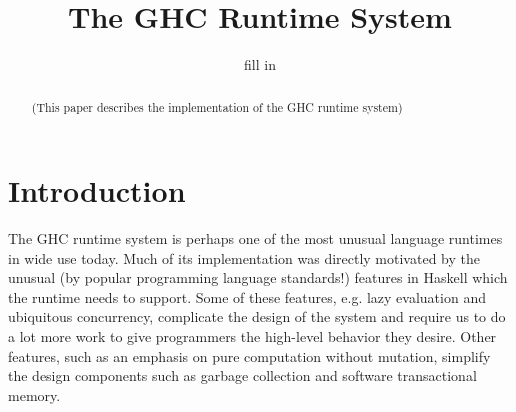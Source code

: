 \documentclass{jfp1}
\title{The GHC Runtime System}
\author{fill in}
\begin{document}
\maketitle

\begin{abstract}
(This paper describes the implementation of the GHC runtime system)
\end{abstract}

\tableofcontents

\section{Introduction}

The GHC runtime system is perhaps one of the most unusual language
runtimes in wide use today.  Much of its implementation was directly
motivated by the unusual (by popular programming language standards!)
features in Haskell which the runtime needs to support.  Some of these
features, e.g. lazy evaluation and ubiquitous concurrency, complicate
the design of the system and require us to do a lot more work to give
programmers the high-level behavior they desire.  Other features, such
as an emphasis on pure computation without mutation, simplify the design
components such as garbage collection and software transactional memory.




\end{document}

